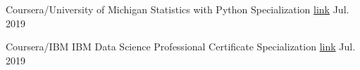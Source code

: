 


\begin{cvhonors}

  \cvhonor
    {Coursera/University of Michigan} %
    {Statistics with Python Specialization} %
    {\href{https://www.coursera.org/account/accomplishments/specialization/W952YECLMS2T}{link}} %
    {Jul. 2019} %

  \cvhonor
    {Coursera/IBM} %
    {IBM Data Science Professional Certificate Specialization} %
    {\href{https://www.coursera.org/account/accomplishments/specialization/BH2XN4WKF7ZP}{link}} %
    {Jul. 2019} %

\end{cvhonors}
